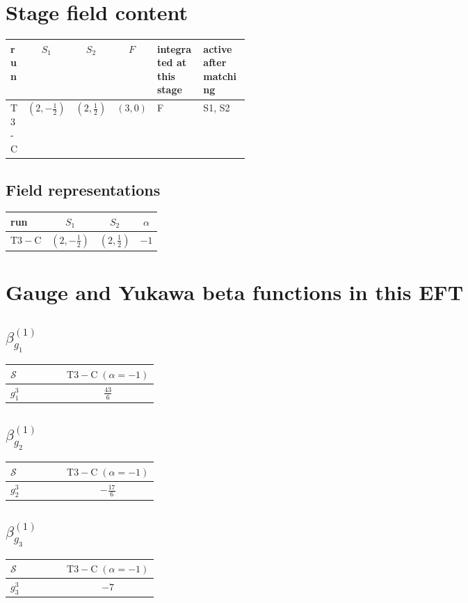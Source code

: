 \documentclass[9pt]{article}
\begin{document}
\section*{Stage field content}
\begin{longtable}{@{}lccc p{0.20\linewidth}p{0.20\linewidth}@{}}
\toprule
run & $S_1$ & $S_2$ & $F$ & integrated at this stage & active after matching \\
\midrule
T3-C & $(2,- \frac{1}{2})$ & $(2,\frac{1}{2})$ & $(3,0)$ & F & S1, S2 \\
\bottomrule
\end{longtable}
\subsection*{Field representations}
\begin{longtable}{@{}lccc@{}}
\toprule
run & $S_1$ & $S_2$ & $\alpha$ \\
\midrule
$\mathrm{T3-C}$ & $(2,- \frac{1}{2})$ & $(2,\frac{1}{2})$ & $-1$ \\
\bottomrule
\end{longtable}
\section*{Gauge and Yukawa beta functions in this EFT}
\subsection*{$ \beta_{g_1}^{(1)} $}
\begin{longtable}{@{}p{0.38\linewidth}c@{}}
\toprule
$\mathcal{S}$ & $ \mathrm{T3-C}\;(\alpha=-1) $ \\
\midrule
$ g_1^3 $ & $ \frac{43}{6} $ \\
\bottomrule
\end{longtable}
\subsection*{$ \beta_{g_2}^{(1)} $}
\begin{longtable}{@{}p{0.38\linewidth}c@{}}
\toprule
$\mathcal{S}$ & $ \mathrm{T3-C}\;(\alpha=-1) $ \\
\midrule
$ g_2^3 $ & $ - \frac{17}{6} $ \\
\bottomrule
\end{longtable}
\subsection*{$ \beta_{g_3}^{(1)} $}
\begin{longtable}{@{}p{0.38\linewidth}c@{}}
\toprule
$\mathcal{S}$ & $ \mathrm{T3-C}\;(\alpha=-1) $ \\
\midrule
$ g_3^3 $ & $ -7 $ \\
\bottomrule
\end{longtable}
\end{document}
